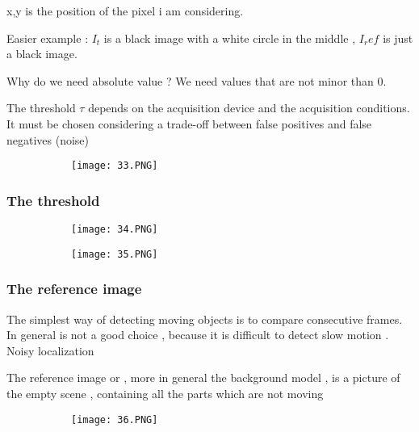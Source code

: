 \documentclass{article}
\begin{document}
x,y is the position of the pixel i am considering.

Easier example : $I_t$ is a black image with a white circle in the middle , $I_ref$ is just a black image.

Why do we need absolute value ? We need values that are not minor than 0.

The threshold $\tau$ depends on the acquisition device and the acquisition conditions. It must be chosen considering a trade-off between false positives and false negatives (noise)





\begin{figure}[ht!]
  \centering
  \begin{subfigure}[b]{0.8\linewidth}
    \texttt{[image: 33.PNG]}
  \end{subfigure}
\end{figure}

\subsubsection{The threshold}


\begin{figure}[ht!]
  \centering
  \begin{subfigure}[b]{0.5\linewidth}
    \texttt{[image: 34.PNG]}
  \end{subfigure}
     \begin{subfigure}[b]{0.49\textwidth}
         \centering
         \texttt{[image: 35.PNG]}
     \end{subfigure}
\end{figure}


\subsubsection{The reference image}

The simplest way of detecting moving objects is to compare consecutive frames. In general is not a good choice , because it is difficult to detect slow motion . Noisy localization

The reference image or , more in general the background model , is a picture of the empty scene , containing all the parts which are not moving

\begin{figure}[ht!]
  \centering
  \begin{subfigure}[b]{0.5\linewidth}
    \texttt{[image: 36.PNG]}
  \end{subfigure}
\end{figure}
\end{document}
